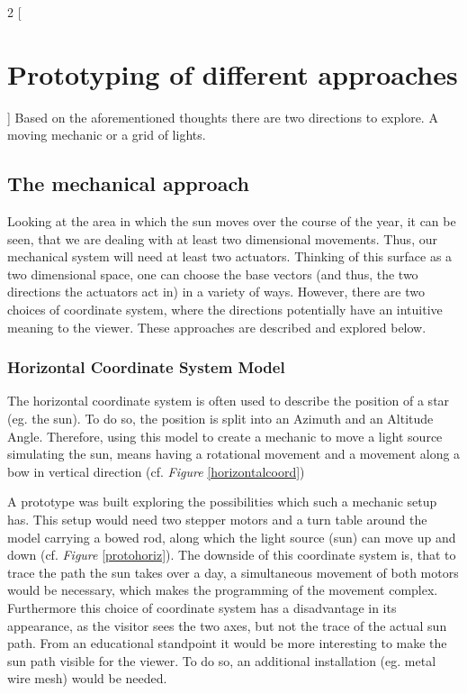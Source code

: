 \documentclass[a4paper,9pt]{article}
\begin{document}
\begin{multicols}{2}
[
\section{Prototyping of different approaches}
]
Based on the aforementioned thoughts there are two directions to explore. A moving mechanic or a grid of lights.
\subsection{The mechanical approach}
Looking at the area in which the sun moves over the course of the year, it can be seen, that we are dealing with at least two dimensional movements. Thus, our mechanical system will need at least two actuators. Thinking of this surface as a two dimensional space, one can choose the base vectors (and thus, the two directions the actuators act in) in a variety of ways. However, there are two choices of coordinate system, where the directions potentially have an intuitive meaning to the viewer. These approaches are described and explored below.
\subsubsection{Horizontal Coordinate System Model }
    \label{hor}
    The horizontal coordinate system is often used to describe the position of a star (eg. the sun). To do so, the position is split into an Azimuth and an Altitude Angle. Therefore, using this model to create a mechanic to move a light source simulating the sun, means having a rotational movement and a movement along a bow in vertical direction (cf. \textit{Figure} \ref{horizontalcoord})
     
   
    A prototype was built exploring the possibilities which such a mechanic setup has. This setup would need two stepper motors and a turn table around the model carrying a bowed rod, along which the light source (sun) can move up and down (cf. \textit{Figure} \ref{protohoriz}). The downside of this coordinate system is, that to trace the path the sun takes over a day, a simultaneous movement of both motors would be necessary, which makes the programming of the movement complex. Furthermore this choice of coordinate system has a disadvantage in its appearance, as the visitor sees the two axes, but not the trace of the actual sun path. From an educational standpoint it would be more interesting to make the sun path visible for the viewer. To do so, an additional installation (eg. metal wire mesh) would be needed.
    
    \end{multicols}
    
\end{document}
